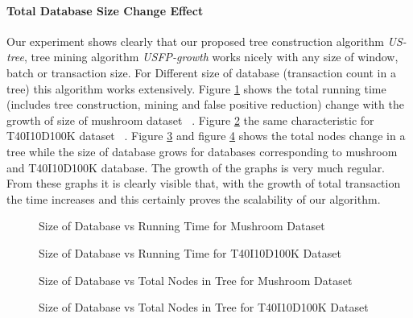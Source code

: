 	\paragraph{Total Database Size Change Effect}Our experiment shows clearly that our proposed tree construction algorithm \emph{US-tree}, tree mining algorithm \emph{USFP-growth} works nicely with any size of window, batch or transaction size. For Different size of database (transaction count in a tree) this algorithm works extensively. Figure \ref{result:g_m_const_tran} shows the total running time (includes tree construction, mining and false positive reduction) change with the growth of size of mushroom dataset ~\cite{dataset}. Figure \ref{result:g_t10_const_tran} the same characteristic for T40I10D100K dataset ~\cite{dataset}. Figure \ref{result:g_m_const_tran_mem} and figure \ref{result:g_t10_const_tran_mem} shows the total nodes change in a tree while the size of database grows for databases corresponding to mushroom and T40I10D100K database. The growth of the graphs is very much regular. From these graphs it is clearly visible that, with the growth of total transaction the time increases and this certainly proves the scalability of our algorithm. 
		\begin{figure}[h]
		\centering
			
		\caption{Size of Database vs Running Time for Mushroom Dataset ~\cite{dataset}}
		\label{result:g_m_const_tran}
		\end{figure}
		\begin{figure}[h]
		\centering
			
		\caption{Size of Database vs Running Time for T40I10D100K Dataset ~\cite{dataset}}
		\label{result:g_t10_const_tran}
		\end{figure}
		\begin{figure}[h]
		\centering
			
		\caption{Size of Database vs Total Nodes in Tree for Mushroom Dataset ~\cite{dataset}}
		\label{result:g_m_const_tran_mem}
		\end{figure}
		\begin{figure}[h]
		\centering
			
		\caption{Size of Database vs Total Nodes in Tree for T40I10D100K Dataset ~\cite{dataset}}
		\label{result:g_t10_const_tran_mem}
		\end{figure}

